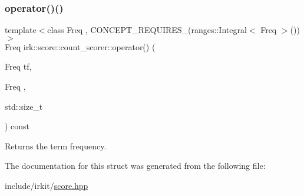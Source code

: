 \subsubsection{\texorpdfstring{operator()()}{operator()()}}
{\footnotesize\ttfamily template$<$class Freq , C\+O\+N\+C\+E\+P\+T\+\_\+\+R\+E\+Q\+U\+I\+R\+E\+S\+\_\+(ranges\+::\+Integral$<$ Freq $>$()) $>$ \\
Freq irk\+::score\+::count\+\_\+scorer\+::operator() (\begin{DoxyParamCaption}\item[{Freq}]{tf,  }\item[{Freq}]{,  }\item[{std\+::size\+\_\+t}]{ }\end{DoxyParamCaption}) const\hspace{0.3cm}{\ttfamily [inline]}}



Returns the term frequency. 



The documentation for this struct was generated from the following file\+:\begin{DoxyCompactItemize}
\item 
include/irkit/\mbox{\hyperlink{score_8hpp}{score.\+hpp}}\end{DoxyCompactItemize}
